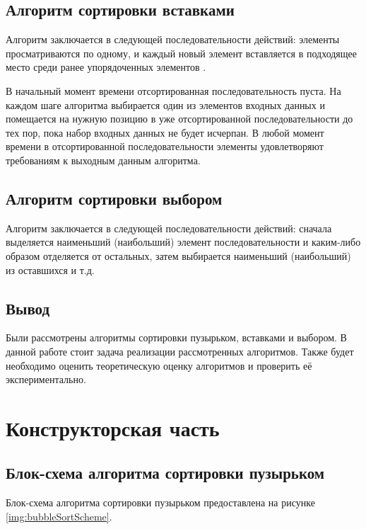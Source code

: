 \documentclass[12pt]{report}
\begin{document}
\section{Алгоритм сортировки вставками}
Алгоритм заключается в следующей последовательности действий: элементы просматриваются по одному, и каждый новый элемент вставляется в подходящее место среди ранее упорядоченных элементов \cite{Knut}.

В начальный момент времени отсортированная последовательность пуста. На каждом шаге алгоритма выбирается один из элементов входных данных и помещается на нужную позицию в уже отсортированной последовательности до тех пор, пока набор входных данных не будет исчерпан. В любой момент времени в отсортированной последовательности элементы удовлетворяют требованиям к выходным данным алгоритма.

\section{Алгоритм сортировки выбором}
Алгоритм заключается в следующей последовательности действий: сначала выделяется наименьший (наибольший) элемент последовательности и каким-либо образом отделяется от остальных, затем выбирается наименьший (наибольший) из оставшихся и т.д. \cite{Knut}

\section*{Вывод}
Были рассмотрены алгоритмы сортировки пузырьком, вставками и выбором. В данной работе стоит задача реализации рассмотренных алгоритмов. Также будет необходимо оценить теоретическую оценку алгоритмов и проверить её экспериментально.

\chapter{Конструкторская часть}
\section{Блок-схема алгоритма сортировки пузырьком}
Блок-схема алгоритма сортировки пузырьком предоставлена на рисунке \ref{img:bubbleSortScheme}.
\end{document}

